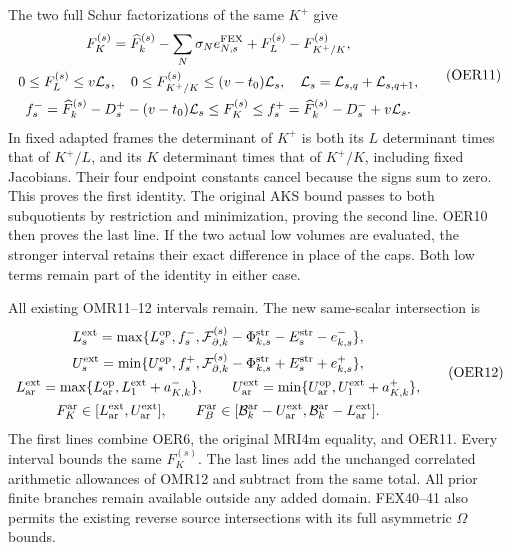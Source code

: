 \documentclass[11pt,a4paper]{article}
\begin{document}
The two full Schur factorizations of the same $K^+$ give
\[
\begin{gathered}
 F_K^{(s)}=\widehat F_k^{(s)}
       -\sum_N\sigma_N e_{N,s}^{\rm FEX}
       +F_L^{(s)}-F_{K^+/K}^{(s)},\\
 0\le F_L^{(s)}\le v\mathcal L_s,\quad
 0\le F_{K^+/K}^{(s)}\le(v-t_0)\mathcal L_s,\quad
 \mathcal L_s=\mathcal L_{s,q}+\mathcal L_{s,q+1},\\
 f_s^-=\widehat F_k^{(s)}-D_s^+-(v-t_0)\mathcal L_s
 \le F_K^{(s)}\le
 f_s^+=\widehat F_k^{(s)}-D_s^-+v\mathcal L_s .
\end{gathered}\tag{OER11}
\]
In fixed adapted frames the determinant of $K^+$ is both its
$L$ determinant times that of $K^+/L$, and its $K$ determinant
times that of $K^+/K$, including fixed Jacobians. Their four
endpoint constants cancel because the signs sum to zero.
This proves the first identity. The original AKS bound passes
to both subquotients by restriction and minimization, proving
the second line. OER10 then proves the last line.
If the two actual low volumes are evaluated, the stronger
interval retains their exact difference in place of the caps.
Both low terms remain part of the identity in either case.

All existing OMR11--12 intervals remain. The new same-scalar
intersection is
\[
\begin{gathered}
 L_s^{\rm ext}=\max\{L_s^{\rm op},f_s^-,
   \mathcal F_{\partial,k}^{(s)}-\Phi_{k,s}^{\rm str}
                          -E_s^{\rm str}-e_{k,s}^-\},\\
 U_s^{\rm ext}=\min\{U_s^{\rm op},f_s^+,
   \mathcal F_{\partial,k}^{(s)}-\Phi_{k,s}^{\rm str}
                          +E_s^{\rm str}+e_{k,s}^+\},\\
 L_{\rm ar}^{\rm ext}
   =\max\{L_{\rm ar}^{\rm op},L_1^{\rm ext}+a_{K,k}^-\},
 \qquad
 U_{\rm ar}^{\rm ext}
   =\min\{U_{\rm ar}^{\rm op},U_1^{\rm ext}+a_{K,k}^+\},\\
 F_K^{\rm ar}\in[L_{\rm ar}^{\rm ext},U_{\rm ar}^{\rm ext}],
 \qquad
 F_B^{\rm ar}\in[\mathcal B_k^{\rm ar}-U_{\rm ar}^{\rm ext},
                 \mathcal B_k^{\rm ar}-L_{\rm ar}^{\rm ext}].
\end{gathered}\tag{OER12}
\]
The first lines combine OER6, the original MRI4m equality,
and OER11. Every interval bounds the same $F_K^{(s)}$.
The last lines add the unchanged correlated arithmetic allowances
of OMR12 and subtract from the same total. All prior finite
branches remain available outside any added domain. FEX40--41
also permits the existing reverse source intersections with
its full asymmetric $\Omega$ bounds.
\end{document}

